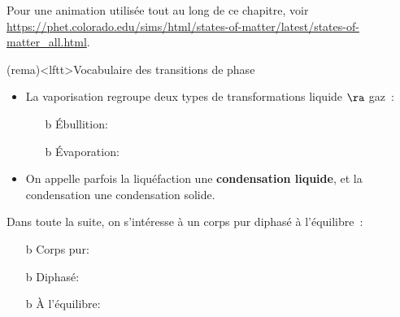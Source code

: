 \documentclass[../../main/main.tex]{subfiles}
\begin{document}
Pour une animation utilisée tout au long de ce chapitre, voir \url{https://phet.colorado.edu/sims/html/states-of-matter/latest/states-of-matter_all.html}.
\begin{tcb}(rema)<lftt>{Vocabulaire des transitions de phase}
	\begin{itemize}
		\item La vaporisation regroupe deux types de transformations liquide $\ra$
		      gaz~:
		      \begin{itemize}
			      \item[b]{Ébullition}:
			      \item[b]{Évaporation}:
		      \end{itemize}
		\item On appelle parfois la liquéfaction une \textbf{condensation liquide},
		      et la condensation une condensation solide.
	\end{itemize}
\end{tcb}

Dans toute la suite, on s'intéresse à un corps pur diphasé à l'équilibre~:
\begin{itemize}
	\item[b]{Corps pur}: 
	\item[b]{Diphasé}: 
	\item[b]{À l'équilibre}: 
\end{itemize}
\end{document}
